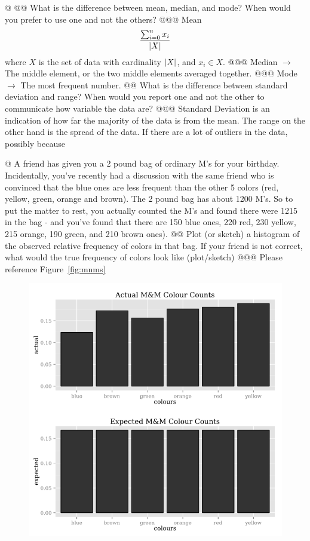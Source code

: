 \documentclass[10pt]{article}
\begin{document}
\begin{easylist}[enumerate]
    @
    @@ What is the difference between mean, median, and mode? When would you prefer to use one and not the others?
    @@@ Mean \[ \frac{\sum^n_{i=0} x_i}{\left\lvert X \right\rvert } \] where $X$ is the set of data with cardinality $\left\lvert X \right\rvert$, and $x_i \in X$.
    @@@ Median $\to$ The middle element, or the two middle elements averaged together.
    @@@ Mode $\to$ The most frequent number.
    @@ What is the difference between standard deviation and range? When would you report one and not the other to communicate how variable the data are?
    @@@ Standard Deviation is an indication of how far the majority of the data is from the mean. The range on the other hand is the spread of the data. If there are a lot of outliers in the data, possibly because 

    @ A friend has given you a 2 pound bag of ordinary M\@M's for your birthday. Incidentally, you've recently had a discussion with the same friend who is convinced that the blue ones are less frequent than the other 5 colors (red, yellow, green, orange and brown). The 2 pound bag has about 1200 M\@M's. So to put the matter to rest, you actually counted the M\@M's and found there were 1215 in the bag - and you've found that there are 150 blue ones, 220 red, 230 yellow, 215 orange, 190 green, and 210 brown ones).
    @@ Plot (or sketch) a histogram of the observed relative frequency of colors in that bag. If your friend is not correct, what would the true frequency of colors look like (plot/sketch)
    @@@ Please reference Figure~\ref{fig:mnms}
        \begin{figure}[ht]
            \centering
            \includegraphics[scale=0.5]{./img/4.png}

\end{figure}
\end{easylist}
\end{document}
